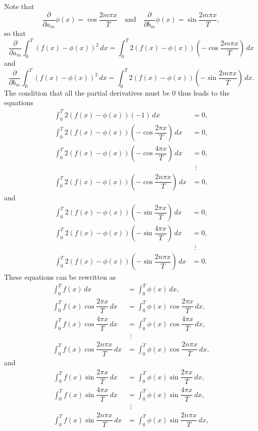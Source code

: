 \enlargethispage*{15pt}
Note that
\[
\dfrac{\partial}{\partial a_m}\phi(x) = \cos\dfrac{2m\pi x}{T}
   \quad \mbox{and} \quad 
\dfrac{\partial}{\partial b_m}\phi(x) = \sin\dfrac{2m\pi x}{T},
\]
so that
\[
\dfrac{\partial}{\partial a_m}
   \int_0^T (f(x) -\phi (x))^2 \, dx 
 = \int_0^T 2(f(x) -\phi (x))
                \left(-\cos\dfrac{2m\pi x}{T}\right)\, dx
\]
and
\[
\dfrac{\partial}{\partial b_m}
\int_0^T (f(x) -\phi (x))^2 \, dx 
 = \int_0^T 2 (f(x) -\phi (x))
                \left(-\sin\dfrac{2m\pi x}{T}\right)\, dx.
\]
The condition 
that all the partial derivatives must be 0 thus leads to the equations
\begin{align*}
\int_0^T 2 (f(x) - \phi(x))(-1) \, dx 
  &= 0, \\[3pt]
\int_0^T 2 (f(x) - \phi(x))
                \left(-\cos\dfrac{2\pi x}{T}\right) \, dx 
  &= 0, \\[6pt]
\int_0^T 2 (f(x) - \phi(x))
                \left(-\cos\dfrac{4\pi x}{T}\right) \, dx 
  &= 0, \\[-5pt]
  &\ \, \vdots \\[-5pt]
\int_0^T 2 (f(x) - \phi(x))
                \left(-\cos\dfrac{2n\pi x}{T}\right) \, dx 
  &= 0, 
\end{align*}
and
\begin{align*}
\int_0^T 2 (f(x) - \phi(x))
                \left(-\sin\dfrac{2\pi x}{T}\right) \, dx
  &= 0, \\[8pt]
\int_0^T 2 (f(x) - \phi(x))
                \left(-\sin\dfrac{4\pi x}{T}\right) \, dx
  &= 0, \\[-3pt]
  &\ \, \vdots \\[-3pt]
\int_0^T 2 (f(x) - \phi(x))
                \left(-\sin\dfrac{2n\pi x}{T}\right) \, dx
  &= 0.
\end{align*}
These equations can be rewritten as
\begin{align*}
\int_0^T f(x) \, dx
  &= \int_0^T \phi(x)\, dx,  \\[10pt]
\int_0^T f(x)\cos\dfrac{2\pi x}{T} \, dx
  &= \int_0^T \phi(x)\cos\dfrac{2\pi x}{T}\, dx,  \\[10pt]
\int_0^T f(x)\cos\dfrac{4\pi x}{T} \, dx
  &= \int_0^T \phi(x)\cos\dfrac{4\pi x}{T}\, dx,  \\[-3pt]
  &\ \, \vdots  \\[-3pt]
\int_0^T f(x)\cos\dfrac{2n\pi x}{T} \, dx
  &= \int_0^T \phi(x)\cos\dfrac{2n\pi x}{T}\, dx,
\end{align*}
and
\begin{align*}
\int_0^T f(x)\sin\dfrac{2\pi x}{T} \, dx
  &= \int_0^T \phi(x)\sin\dfrac{2\pi x}{T}\, dx,  \\[10pt]
\int_0^T f(x)\sin\dfrac{4\pi x}{T} \, dx
  &= \int_0^T \phi(x)\sin\dfrac{4\pi x}{T}\, dx,  \\[-3pt]
  &\ \, \vdots  \\[-3pt]
\int_0^T f(x)\sin\dfrac{2n\pi x}{T} \, dx
  &= \int_0^T \phi(x)\sin\dfrac{2n\pi x}{T} \, dx,
\end{align*}

